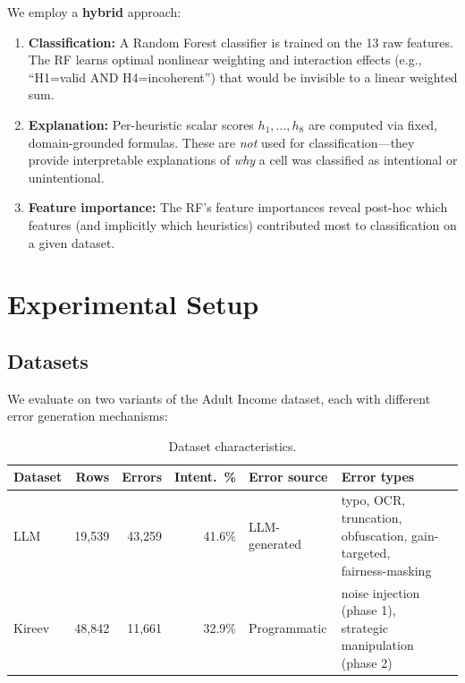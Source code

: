\documentclass[11pt,a4paper]{article}
\begin{document}
We employ a \textbf{hybrid} approach:

\begin{enumerate}[nosep]
  \item \textbf{Classification:} A Random Forest classifier is trained on the
        13 raw features.  The RF learns optimal nonlinear weighting and
        interaction effects (e.g., ``H1=valid AND H4=incoherent'') that
        would be invisible to a linear weighted sum.
  \item \textbf{Explanation:} Per-heuristic scalar scores $h_1, \ldots, h_8$
        are computed via fixed, domain-grounded formulas.  These are
        \emph{not} used for classification---they provide interpretable
        explanations of \emph{why} a cell was classified as intentional or
        unintentional.
  \item \textbf{Feature importance:} The RF's feature importances reveal
        post-hoc which features (and implicitly which heuristics) contributed
        most to classification on a given dataset.
\end{enumerate}

\section{Experimental Setup}
\label{sec:experiments}

\subsection{Datasets}

We evaluate on two variants of the Adult Income dataset, each with different
error generation mechanisms:

\begin{table}[h]
\centering
\caption{Dataset characteristics.}
\label{tab:datasets}
\small
\begin{tabular}{@{}lrrrll@{}}
\toprule
\textbf{Dataset} & \textbf{Rows} & \textbf{Errors} & \textbf{Intent.\ \%} & \textbf{Error source} & \textbf{Error types} \\
\midrule
LLM    & 19{,}539 & 43{,}259 & 41.6\% & LLM-generated & \makecell[tl]{typo, OCR, truncation,\\obfuscation, gain-targeted,\\fairness-masking} \\
\addlinespace
Kireev & 48{,}842 & 11{,}661 & 32.9\% & Programmatic  & \makecell[tl]{noise injection (phase 1),\\strategic manipulation (phase 2)} \\
\bottomrule
\end{tabular}
\end{table}
\end{document}
